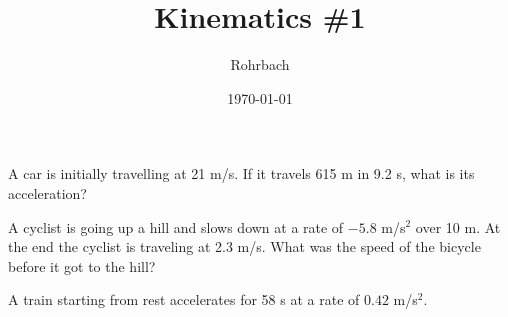 \documentclass[10pt]{exam}
\title{Kinematics \#1}
\author{Rohrbach}
\date{\today}
\begin{document}
\maketitle

\begin{questions}
  \question
    A car is initially travelling at 21 m/s.  If it travels 615 m in 9.2 s, what is its acceleration?
    \vs[2]

  \question
    A cyclist is going up a hill and slows down at a rate of $-5.8$ m/s$^2$ over 10 m.  At the end the cyclist is traveling at 2.3 m/s.  What was the speed of the bicycle before it got to the hill?
    \vs[2]

  \question
    A train starting from rest accelerates for 58 s at a rate of $0.42$ m/s$^2$.

  
\end{questions}
\end{document}
